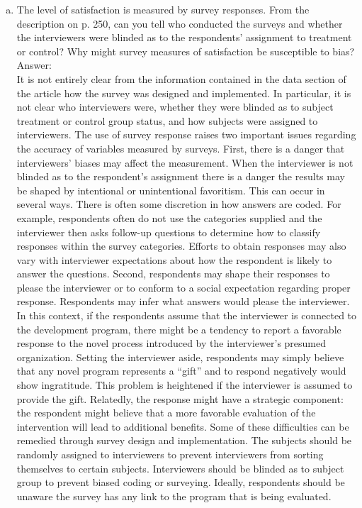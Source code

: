 \documentclass[11pt,notitlepage]{article}\usepackage[]{graphicx}\usepackage[]{color}
\begin{document}
\begin{enumerate}[a)]
\item The level of satisfaction is measured by survey responses. From the description on p. 250, can you tell who conducted the surveys and whether the interviewers were blinded as to the respondents' assignment to treatment or control? Why might survey measures of satisfaction be susceptible to bias?\\
Answer:\\
It is not entirely clear from the information contained in the data section of the article how the survey was designed and implemented. In particular, it is not clear who interviewers were, whether they were blinded as to subject treatment or control group status, and how subjects were assigned to interviewers. 
The use of survey response raises two important issues regarding the accuracy of variables measured by surveys. First, there is a danger that interviewers' biases may affect the measurement. When the interviewer is not blinded as to the respondent's assignment there is a danger the results may be shaped by intentional or unintentional favoritism. This can occur in several ways. There is often some discretion in how answers are coded. For example, respondents often do not use the categories supplied and the interviewer then asks follow-up questions to determine how to classify responses within the survey categories. Efforts to obtain responses may also vary with interviewer expectations about how the respondent is likely to answer the questions. Second, respondents may shape their responses to please the interviewer or to conform to a social expectation regarding proper response. Respondents may infer what answers would please the interviewer. In this context, if the respondents assume that the interviewer is connected to the development program, there might be a tendency to report a favorable response to the novel process introduced by the interviewer's presumed organization. Setting the interviewer aside, respondents may simply believe that any novel program represents a ``gift'' and to respond negatively would show ingratitude. This problem is heightened if the interviewer is assumed to provide the gift. Relatedly, the response might have a strategic component: the respondent might believe that a more favorable evaluation of the intervention will lead to additional benefits. 
Some of these difficulties can be remedied through survey design and implementation. The subjects should be randomly assigned to interviewers to prevent interviewers from sorting themselves to certain subjects. Interviewers should be blinded as to subject group to prevent biased coding or surveying. Ideally, respondents should be unaware the survey has any link to the program that is being evaluated.


\end{enumerate}
\end{document}

